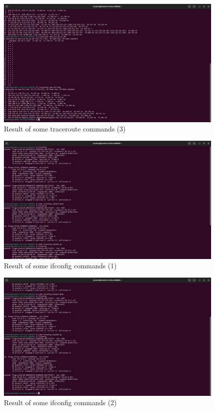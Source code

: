 \documentclass[11pt]{article}
\begin{document}
\begin{figure}
    \centering
    \includegraphics[width=\textwidth]{traceroute 4.jpg}
    \caption{Result of some traceroute commands (3)}  
\end{figure}

\begin{figure}
    \centering
    \includegraphics[width=\textwidth]{ifconfig 5.jpg}
    \caption{Result of some ifconfig commands (1)}  
\end{figure}

\begin{figure}
    \centering
    \includegraphics[width=\textwidth]{ifconfig 6.jpg}
    \caption{Result of some ifconfig commands (2)}  
\end{figure}
\end{document}
